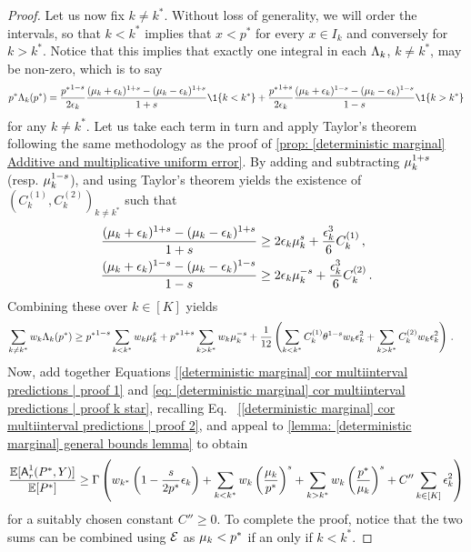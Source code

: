 \begin{proof}
    Let us now fix $k\neq k^*$. Without loss of generality, we will order the intervals, so that $k<k^*$ implies that $x< p^*$ for every $x\in I_k$ and conversely for $k>k^*$. Notice that this implies that exactly one integral in each $\Lambda_k$, $k\neq k^*$, may be non-zero, which is to say 
    \begin{align}
        \price\detpricefun_k(\price)= \frac{{\price}^{1-\smth}}{2\epsilon_k}\frac{(\locus_k+\epsilon_k)^{1+\smth}-(\locus_k-\epsilon_k)^{1+\smth}}{1+\smth}\1{\{k<k^*\}}+ \frac{{\price}^{1+\smth}}{2\epsilon_k}\frac{(\locus_k+\epsilon_k)^{1-\smth}-(\locus_k-\epsilon_k)^{1-\smth}}{1-\smth}\1{\{k>k^*\}}\notag
    \end{align}
    for any $k\neq k^*$.
    Let us take each term in turn and apply Taylor's theorem following the same methodology as the proof of \cref{prop: [deterministic marginal] Additive and multiplicative uniform error}. By adding and subtracting $\mu_k^{1+s}$ (resp. $\mu_k^{1-s}$), and using Taylor's theorem yields the existence of $(C_k^{(1)},C_k^{(2)})_{k\neq k^*}$ such that
    \begin{align}
        \frac{(\mu_k+\epsilon_k)^{1+s}-(\mu_k-\epsilon_k)^{1+s}}{1+s}&\ge 
        2\epsilon_k\mu_k^{s}+ \frac{\epsilon_k^3}{6}C_k^{(1)}\,,
        \notag \\
        \frac{(\mu_k+\epsilon_k)^{1-s}-(\mu_k-\epsilon_k)^{1-s}}{1-s}&\ge 
        2\epsilon_k\mu_k^{-s}+\frac{\epsilon_k^3}{6}C_k^{(2)}\,.
        \notag
    \end{align}
    Combining these over $k\in[K]$ yields
    \begin{align}
        \sum_{k\neq k^*}w_k\Lambda_k(p^*)&\ge {p^*}^{1-s}\sum_{k<k^*}w_k\mu_k^{s}+{p^*}^{1+s}\sum_{k>k^*}w_k\mu_k^{-s} + \frac{1}{12}\left(\sum_{k<k^*}C_k^{(1)}\theta^{1-s}w_k\epsilon_k^2+\sum_{k>k^*}C_k^{(2)}w_k\epsilon_k^2\right)\,. \label{[deterministic marginal] cor multiinterval predictions | proof 2}
    \end{align}    Now, add together Equations \eqref{[deterministic marginal] cor multiinterval predictions | proof 1} and \eqref{eq: [deterministic marginal] cor multiinterval predictions | proof k star}, recalling Eq.~ \eqref{[deterministic marginal] cor multiinterval predictions | proof 2}, and appeal to \cref{lemma: [deterministic marginal] general bounds lemma} to obtain
    \begin{align}
        \frac{\mathbb{E}[\mbox{\textup{\textsf{A}}}^1_r(P^*,Y)]}{\mathbb{E}[P^*]}\ge \Gamma\left( w_{k^*}\left(1-\frac{s}{2p^*}\epsilon_k\right) + \sum_{k<k^*}w_k\left(\frac{\mu_k}{p^*}\right)^{s}+\sum_{k>k^*}w_k\left(\frac{p^*}{\mu_k}\right)^{s} + C''\sum_{k\in[K]}\epsilon_k^2\right)
    \end{align}
    for a suitably chosen constant $C''\ge 0$. To complete the proof, notice that the two sums can be combined using $\mathcal{E}$ as $\mu_k<p^*$ if an only if $k<k^*$. 
\end{proof}

